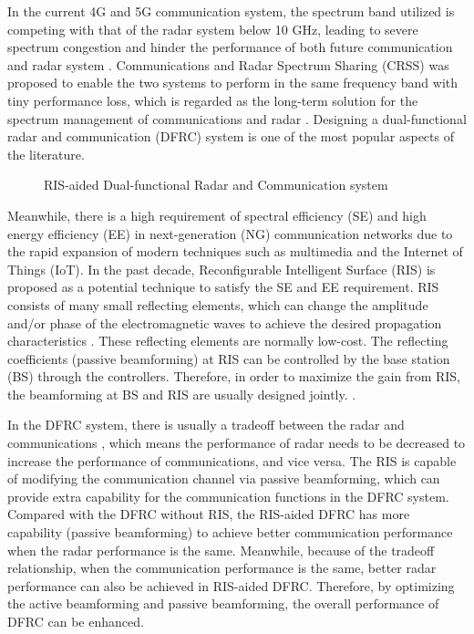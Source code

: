 In the current 4G and 5G communication system, the spectrum band utilized is 
competing with that of the radar system below 10 GHz, leading to severe 
spectrum congestion and hinder the performance of both future communication 
and radar system \cite{liu2020road}. Communications and Radar Spectrum Sharing (CRSS) was proposed to enable 
the two systems to perform in the same frequency band with tiny performance loss, 
which is regarded as the long-term solution for the spectrum management of 
communications and radar \cite{liu2020tutorial,feng2020survey}. Designing a dual-functional 
radar and communication (DFRC) system is one of the most popular aspects of the literature.

\begin{figure}[htbp]
    \centering
    \caption{RIS-aided Dual-functional Radar and Communication system}
    \label{fig:setup}
\end{figure}

Meanwhile, there is a high requirement of spectral efficiency (SE) and high energy efficiency (EE)
in next-generation (NG) communication networks due to the rapid expansion of modern techniques such as
multimedia and the Internet of Things (IoT).
In the past decade, Reconfigurable Intelligent Surface (RIS) is proposed as a 
potential technique to satisfy the SE and EE requirement.
RIS consists of many small reflecting elements, which can change the amplitude and/or phase of the electromagnetic waves 
to achieve the desired propagation characteristics \cite{liu2020RIS}. These reflecting elements are normally low-cost.
The reflecting coefficients (passive beamforming) at RIS can be controlled by the base 
station (BS) through the controllers. Therefore, in order to maximize the gain from RIS,
the beamforming at BS and  RIS are usually designed jointly. \cite{guo2019WSR,wu2019IRS,guo2020ris}.


In the DFRC system, there is usually a tradeoff between the radar and communications \cite{xu2020tradeoff}, which
means the performance of radar needs to be decreased to increase the performance of communications,
and vice versa. The RIS is capable of modifying the communication channel via passive beamforming,
which can provide extra capability for the communication functions in the DFRC system. Compared
with the DFRC without RIS, the RIS-aided DFRC has more capability (passive beamforming)
to achieve better communication performance when the radar performance is the same. Meanwhile, because of the 
tradeoff relationship, when the communication performance is the same, better radar performance can also be achieved in RIS-aided DFRC.
Therefore, by optimizing the active beamforming and passive beamforming, the overall performance of DFRC
can be enhanced.